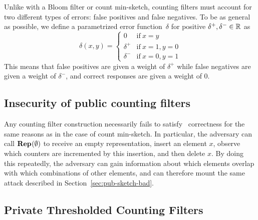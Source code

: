 %
Unlike with a Bloom filter or count min-sketch, counting filters must account
for two different types of errors: false positives and false negatives. To be as
general as possible, we define a parametrized error function~$\delta$ for
positive $\delta^+, \delta^- \in \mathbb{R}$ as
\begin{equation}
  \delta(x, y) =
  \begin{cases}
    0 & \text{if}\ x = y \\
    \delta^+ & \text{if}\ x = 1, y = 0 \\
    \delta^- & \text{if}\ x = 0, y = 1
  \end{cases}
\end{equation}
This means that false positives are given a weight of $\delta^+$ while false
negatives are given a weight of $\delta^-$, and correct responses are given a
weight of 0.

\subsection{Insecurity of public counting filters}
Any counting filter construction necessarily fails to satisfy \errep\
correctness for the same reasons as in the case of count min-sketch. In
particular, the adversary can call $\textup{\textbf{Rep}}\hspace{0.5pt}(\emptyset)$ to receive an empty
representation, insert an element $x$, observe which counters are incremented by
this insertion, and then delete $x$. By doing this repeatedly, the adversary can
gain information about which elements overlap with which combinations of other
elements, and can therefore mount the same attack described in
Section~\ref{sec:pub-sketch-bad}.

\subsection{Private Thresholded Counting Filters}

